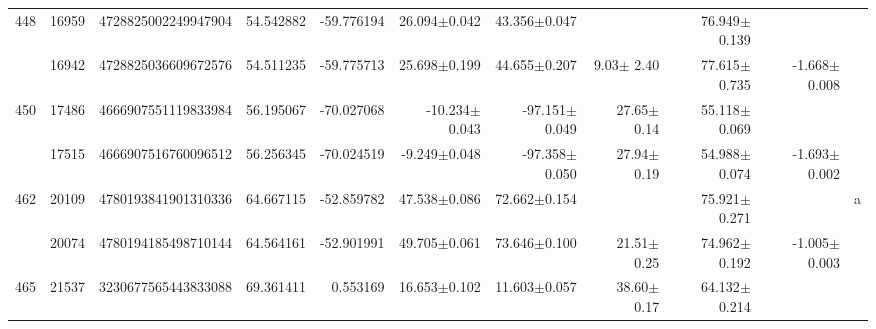 \documentclass{ws-ijmpd}
\begin{document}
\begin{landscape}
\begin{longtable}{rrrrrrrrrrl}
 \hline 448 &   16959 &      4728825002249947904 &                    54.542882 &                   -59.776194 &                 26.094$\pm$0.042 &                 43.356$\pm$0.047 &                           &        76.949$\pm$0.139 &                                           &                                                    \\
            &   16942 &      4728825036609672576 &                    54.511235 &                   -59.775713 &                 25.698$\pm$0.199 &                 44.655$\pm$0.207 &           9.03$\pm$  2.40 &        77.615$\pm$0.735 &                          -1.668$\pm$0.008 &                                                    \\
 \hline 450 &   17486 &      4666907551119833984 &                    56.195067 &                   -70.027068 &                -10.234$\pm$0.043 &                -97.151$\pm$0.049 &          27.65$\pm$  0.14 &        55.118$\pm$0.069 &                                           &                                                    \\
            &   17515 &      4666907516760096512 &                    56.256345 &                   -70.024519 &                 -9.249$\pm$0.048 &                -97.358$\pm$0.050 &          27.94$\pm$  0.19 &        54.988$\pm$0.074 &                          -1.693$\pm$0.002 &                                                    \\
 \hline 462 &   20109 &      4780193841901310336 &                    64.667115 &                   -52.859782 &                 47.538$\pm$0.086 &                 72.662$\pm$0.154 &                           &        75.921$\pm$0.271 &                                           &                                                  a \\
            &   20074 &      4780194185498710144 &                    64.564161 &                   -52.901991 &                 49.705$\pm$0.061 &                 73.646$\pm$0.100 &          21.51$\pm$  0.25 &        74.962$\pm$0.192 &                          -1.005$\pm$0.003 &                                                    \\
 \hline 465 &   21537 &      3230677565443833088 &                    69.361411 &                     0.553169 &                 16.653$\pm$0.102 &                 11.603$\pm$0.057 &          38.60$\pm$  0.17 &        64.132$\pm$0.214 &                                           &                                                    \\

\end{longtable}
\end{landscape}
\end{document}
